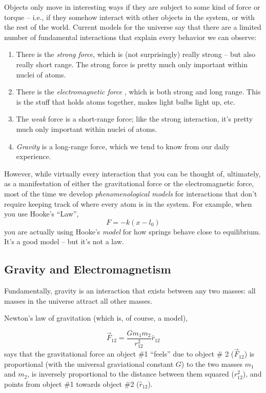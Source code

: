 \documentclass{tufte-handout}
\begin{document}
Objects only move in interesting ways if they are subject to some kind of force or torque -- i.e., if they somehow interact with other objects in the system, or with the rest of the world.  Current models for the universe say that there are a limited number of fundamental interactions that explain every behavior we can observe:
\begin{enumerate}
\item There is the {\it strong force}, which is (not surprisingly) really strong -- but also really short range.  The strong force is pretty much only important within nuclei of atoms.
\item There is the {\it electromagnetic force} , which is both strong and long range.  This is the stuff that holds atoms together, makes light bulbs light up, etc.
\item The {\it weak} force is a short-range force; like the strong interaction, it's pretty much only important within nuclei of atoms.
\item {\it Gravity} is a long-range force, which we tend to know from our daily experience.
\end{enumerate}

However, while virtually every interaction that you can be thought of, ultimately, as a manifestation of either the gravitational force or the electromagnetic force, most of the time we develop {\it phenomenological models} for interactions that don't require keeping track of where every atom is in the system.  For example, when you use Hooke's ``Law'',
$$ F = - k (x-l_0)$$
you are actually using Hooke's {\it model} for how springs behave close to equilibrium.  It's a good model -- but it's not a law. 

\subsection{Gravity and Electromagnetism}
Fundamentally, gravity is an interaction that exists between any two masses:  all masses in the universe attract all other masses.

Newton's law of gravitation (which is, of course, a model),

$$\vec{F}_{12}=\frac{Gm_1m_2}{r_{12}^2}\hat{r}_{12}$$
says 
 that the gravitational force an object \#1 ``feels'' due to object \# 2 ($\vec{F}_{12}$) is proportional (with the universal graviational constant $G$) to the two masses $m_1$ and $m_2$, is inversely proportional to the distance between them squared ($r_{12}^2$), and points from object \#1 towards object \#2 ($\hat{r}_{12}$).  
 
\end{document}
